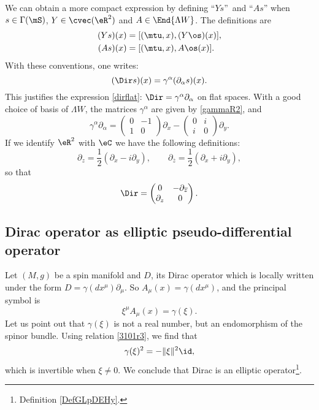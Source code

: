 We can obtain a more compact expression by defining ``$Ys$''\ and ``$As$'' when $s\in\Gamma(\mS)$, $Y\in\cvec(\eR^2)$ and $A\in\End{\Lambda W }$. The definitions are
\begin{align*}
(Ys)(x)&=[(\mtu,x),(Y\os)(x)],\\
(As)(x)&=[(\mtu,x),A\os(x)].
\end{align*}
With these conventions, one writes:
\[
(\Dir s)(x)=\gamma^{\alpha}(\partial_{\alpha} s)(x).
\]
This justifies the expression \eqref{dirflat}: $\Dir=\gamma^{\alpha}\partial_{\alpha}$ on flat spaces. With a good choice of basis of $\Lambda W $, the matrices $\gamma^{\alpha}$ are given by \eqref{gammaR2}, and
\[
\gamma^{\alpha}\partial_{\alpha}=
\begin{pmatrix}
0 & -1 \\
1 & 0
\end{pmatrix}\partial_x-
\begin{pmatrix}
0 & i \\
i & 0
\end{pmatrix}\partial_y.
\] 
If we identify $\eR^2$ with $\eC$ we have the following definitions:
\[
\partial_z=\frac{1}{2}(\partial_x-i\partial_y),\qquad\partial_{\overline{z}}=\frac{1}{2}(\partial_x+i\partial_y),\]
so that
\[\Dir=\begin{pmatrix}
0 & -\partial_{\overline{z}} \\
\partial_z & 0
\end{pmatrix}.
\]

\subsection{Dirac operator as elliptic pseudo-differential operator}
\label{subSecREctBOh}

Let $(M,g)$ be a spin manifold and $D$, its Dirac operator which is locally written under the form $D=\gamma(dx^{\mu})\partial_{\mu}$. So $A_{\mu}(x)=\gamma(dx^{\mu})$, and the principal symbol is
\[ 
  \xi^{\mu}A_{\mu}(x)=\gamma(\xi).
\]
Let us point out that $\gamma(\xi)$ is not a real number, but an endomorphism of the spinor bundle. Using relation \eqref{3101r3}, we find that
\[ 
  \gamma(\xi)^2=-\| \xi \|^2\id,
\]
which is invertible when $\xi\neq 0$. We conclude that Dirac is an elliptic operator\footnote{Definition \ref{DefGLpDEHy}.}.


